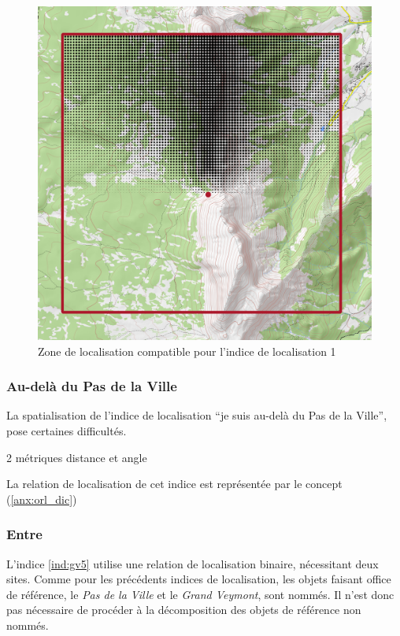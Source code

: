 \begin{figure}
  \centering
  \includegraphics{../figures/NordExterne_PasVille_GrandVeymont.png}
  \caption{Zone de localisation compatible pour l'indice de
    localisation 1}
  \label{fig:ZLC_GrandVeymont_3}
\end{figure}




\subsubsection{Au-delà du Pas de la Ville}

La spatialisation de l'indice de localisation \enquote{je suis au-delà
  du Pas de la Ville}, pose certaines difficultés.


2 métriques distance et angle



La relation de localisation de cet indice est représentée par le
concept 
(\autoref{anx:orl_dic})

\subsubsection{Entre}

L'indice \ref{ind:gv5} utilise une relation de localisation binaire,
nécessitant deux sites. Comme pour les précédents indices de
localisation, les objets faisant office de référence, le \emph{Pas de
  la Ville} et le \emph{Grand Veymont}, sont nommés. Il n'est donc pas
nécessaire de procéder à la décomposition des objets de référence non
nommés.

